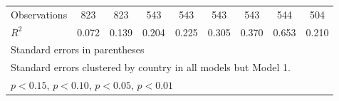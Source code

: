 \documentclass[12pt, letterpaper]{article}
\begin{document}
\begin{landscape}
\begin{table}[htbp]
\begin{small}
\begin{tabular}{l*{8}{c}}
\\                  
\hline
Observations        &         823         &         823         &         543         &         543         &         543         &         543         &         544         &         504         \\
\(R^{2}\)           &       0.072         &       0.139         &       0.204         &       0.225         &       0.305         &       0.370         &       0.653         &       0.210         \\
\hline\hline
\multicolumn{9}{l}{\footnotesize Standard errors in parentheses}\\
\multicolumn{9}{l}{\footnotesize Standard errors clustered by country in all models but Model 1.}\\
\multicolumn{9}{l}{\footnotesize \sym{+} \(p<0.15\), \sym{*} \(p<0.10\), \sym{**} \(p<0.05\), \sym{***} \(p<0.01\)}\\
\end{tabular}
\end{small}
\end{table}
\end{landscape}
\end{document}
